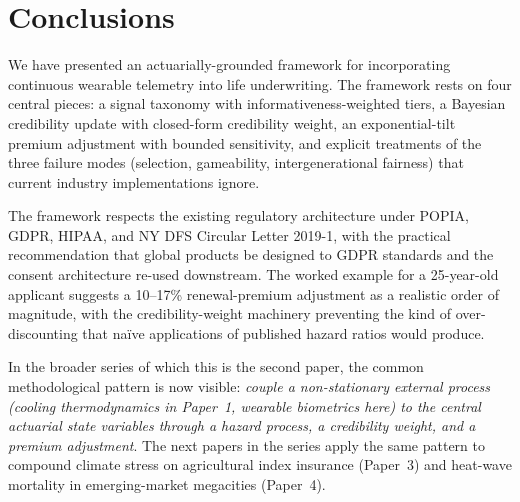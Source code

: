 \section{Conclusions}\label{sec:concl}

We have presented an actuarially-grounded framework for incorporating
continuous wearable telemetry into life underwriting. The framework
rests on four central pieces: a signal taxonomy with
informativeness-weighted tiers, a Bayesian credibility update with
closed-form credibility weight, an exponential-tilt premium
adjustment with bounded sensitivity, and explicit treatments of the
three failure modes (selection, gameability, intergenerational
fairness) that current industry implementations ignore.

The framework respects the existing regulatory architecture under
POPIA, GDPR, HIPAA, and NY DFS Circular Letter 2019-1, with the
practical recommendation that global products be designed to GDPR
standards and the consent architecture re-used downstream. The
worked example for a 25-year-old applicant suggests a 10--17\%
renewal-premium adjustment as a realistic order of magnitude, with
the credibility-weight machinery preventing the kind of
over-discounting that na\"ive applications of published hazard
ratios would produce.

In the broader series of which this is the second paper, the
common methodological pattern is now visible: \emph{couple a
non-stationary external process (cooling thermodynamics in
Paper~1, wearable biometrics here) to the central actuarial state
variables through a hazard process, a credibility weight, and a
premium adjustment}. The next papers in the series apply the same
pattern to compound climate stress on agricultural index
insurance (Paper~3) and heat-wave mortality in emerging-market
megacities (Paper~4).

